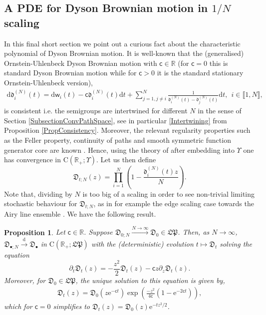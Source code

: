 \documentclass[]{article}
\newtheorem{prop}[thm]{Proposition}
\begin{document}
\subsection{A PDE for Dyson Brownian motion in $1/N$ scaling}

In this final short section we point out a curious fact about the characteristic polynomial of Dyson Brownian motion. It is well-known \cite{Warren,ShkolnikovRamanan,Interlacing,HuaPickrellDiffusions} that the (generalised) Ornstein-Uhlenbeck Dyson Brownian motion with $\mathsf{c}\in \mathbb{R}$ (for $\mathsf{c}=0$ this is standard Dyson Brownian motion while for $\mathsf{c}>0$ it is the standard stationary Ornstein-Uhlenbeck version),
 \begin{align}
		\mathrm{d}\mathfrak{d}_i^{(N)}(t) = 
 \mathrm{d}\mathsf{w}_i(t)  
 -\mathsf{c}\mathfrak{d}^{(N)}_i(t)\mathrm{d}t
 +\sum_{j=1,j\neq i}^N\frac{1}{\mathfrak{d}^{(N)}_i(t)-\mathfrak{d}^{(N)}_j(t)}
 \mathrm{d}t, \ \  i\in \llbracket 1, N \rrbracket,
\end{align}
is consistent i.e. the semigroups are intertwined for different $N$ in the sense of Section \ref{SubsectionConvPathSpace}, see in particular \eqref{Intertwining} from Proposition \ref{PropConsistency}. Moreover, the relevant regularity properties such as the Feller property, continuity of paths and smooth symmetric function generator core are known \cite{DunklProcesses}. Hence, using the theory of \cite{AM24} after embedding into $\Upsilon$ one has convergence in $\mathrm{C}(\mathbb{R}_+;\Upsilon)$. Let us then define
\begin{equation*}
\mathfrak{D}_{t;N}(z)=\prod_{i=1}^N\left(1-\frac{\mathfrak{d}_i^{(N)}(t)z}{N}\right).
\end{equation*}
Note that, dividing by $N$ is too big of a scaling in order to see non-trivial limiting stochastic behaviour for $\mathfrak{D}_{t;N}$, as in for example the edge scaling case towards the Airy line ensemble \cite{HuangZhang}. We have the following result. 

\begin{prop} Let $\mathsf{c}\in \mathbb{R}$. Suppose $\mathfrak{D}_{0;N} \overset{N \to \infty}{\longrightarrow} \mathfrak{D}_0 \in \mathfrak{LP}$. Then, as $N \to \infty$, $\mathfrak{D}_{\bullet;N} \overset{\mathrm{d}}{\longrightarrow}\mathfrak{D}_{\bullet}$ in $\mathrm{C}(\mathbb{R}_+;\mathfrak{LP})$ with the (deterministic) evolution $t\mapsto\mathfrak{D}_t$ solving the equation
\begin{equation}\label{1stOrderPDE}
\partial_t \mathfrak{D}_t(z)=-\frac{z^2}{2}\mathfrak{D}_t(z)-\mathsf{c}z\partial_z\mathfrak{D}_t(z).
\end{equation}
Moreover, for $\mathfrak{D}_0\in \mathfrak{LP}$, the unique solution to this equation is given by,
    \begin{align*}
        \mathfrak{D}_t(z)
        =\mathfrak{D}_0\left(z\mathrm{e}^{-\mathsf{c}t}\right)
        \exp\left(\frac{-z^2}{4\mathsf{c}}
        \left(1-\mathrm{e}^{-2\mathsf{c}t}\right)\right),
    \end{align*}
which for $\mathsf{c}=0$ simplifies to $\mathfrak{D}_t(z)=\mathfrak{D}_0(z)\mathrm{e}^{-tz^2/2}$.
\end{prop}
\end{document}
